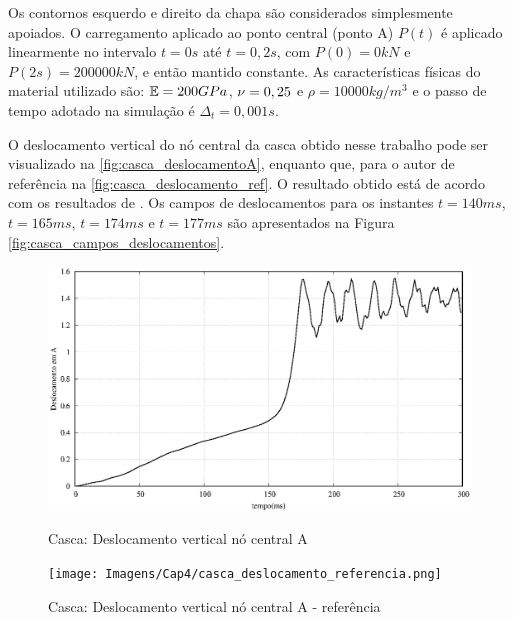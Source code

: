 Os contornos esquerdo e direito da chapa são considerados simplesmente apoiados. O carregamento aplicado ao ponto central (ponto A) $P(t)$ é aplicado linearmente no intervalo $t=0s$ até $t=0,2s$, com $P(0)=0kN$ e $P(2s) = 200000kN$, e então mantido constante. As características físicas do material utilizado são: $\mathbb{E} = 200GPa$, $\nu = 0,25$ e $\rho = 10000 kg/m^3$ e o passo de tempo adotado na simulação é $\Delta_{t} = 0,001s$.

O deslocamento vertical do nó central da casca obtido nesse trabalho pode ser visualizado na \autoref{fig:casca_deslocamentoA}, enquanto que, para o autor de referência na \autoref{fig:casca_deslocamento_ref}. O resultado obtido está de acordo com os resultados de . Os campos de deslocamentos para os instantes $t = 140ms$, $t = 165ms$, $t = 174ms$ e $t = 177ms$ são apresentados na Figura \ref{fig:casca_campos_deslocamentos}.

\begin{figure}[!htbp]
	\caption{Casca: Deslocamento vertical nó central A}
	\centering
	{\includegraphics[scale=.6, trim=0cm 0cm 0cm 0cm, clip=true]{Imagens/Cap4/casca_deslocamentoA.eps}}
	\label{fig:casca_deslocamentoA}
\end{figure}

\begin{figure}[!htbp]
	\caption{Casca: Deslocamento vertical nó central A - referência}
	\centering
	{\texttt{[image: Imagens/Cap4/casca\_deslocamento\_referencia.png]}}
	\label{fig:casca_deslocamento_ref}
\end{figure}

